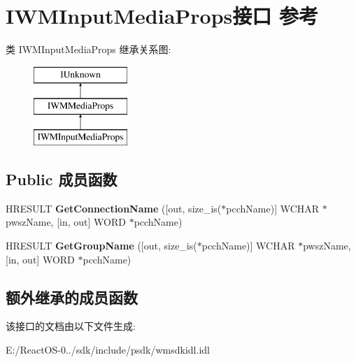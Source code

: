 \hypertarget{interface_i_w_m_input_media_props}{}\section{I\+W\+M\+Input\+Media\+Props接口 参考}
\label{interface_i_w_m_input_media_props}
类 I\+W\+M\+Input\+Media\+Props 继承关系图\+:\begin{figure}[H]
\begin{center}
\leavevmode
\includegraphics[height=3.000000cm]{interface_i_w_m_input_media_props}
\end{center}
\end{figure}
\subsection*{Public 成员函数}
\begin{DoxyCompactItemize}
\item 
\mbox{\label{interface_i_w_m_input_media_props_af4f87ba8968eb67539837c64aef317e5}} 
H\+R\+E\+S\+U\+LT {\bfseries Get\+Connection\+Name} (\mbox{[}out, size\+\_\+is($\ast$pcch\+Name)\mbox{]} W\+C\+H\+AR $\ast$pwsz\+Name, \mbox{[}in, out\mbox{]} W\+O\+RD $\ast$pcch\+Name)
\item 
\mbox{\label{interface_i_w_m_input_media_props_a6eba241d6f0af73eb05c603c3fde1855}} 
H\+R\+E\+S\+U\+LT {\bfseries Get\+Group\+Name} (\mbox{[}out, size\+\_\+is($\ast$pcch\+Name)\mbox{]} W\+C\+H\+AR $\ast$pwsz\+Name, \mbox{[}in, out\mbox{]} W\+O\+RD $\ast$pcch\+Name)
\end{DoxyCompactItemize}
\subsection*{额外继承的成员函数}


该接口的文档由以下文件生成\+:\begin{DoxyCompactItemize}
\item 
E\+:/\+React\+O\+S-\/0../sdk/include/psdk/wmsdkidl.\+idl\end{DoxyCompactItemize}
